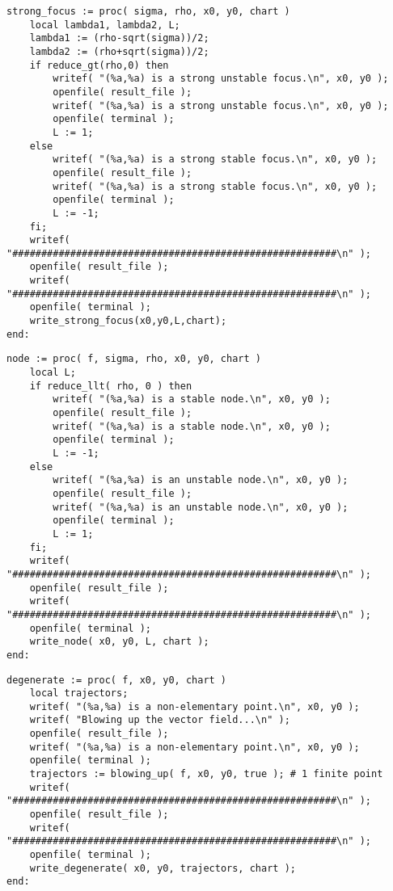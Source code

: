 \documentclass[a4paper,10pt]{article}
\begin{document}
\begin{lstlisting}[name=type]
strong_focus := proc( sigma, rho, x0, y0, chart )
    local lambda1, lambda2, L;
    lambda1 := (rho-sqrt(sigma))/2;
    lambda2 := (rho+sqrt(sigma))/2;
    if reduce_gt(rho,0) then
        writef( "(%a,%a) is a strong unstable focus.\n", x0, y0 );
        openfile( result_file );
        writef( "(%a,%a) is a strong unstable focus.\n", x0, y0 );
        openfile( terminal );
        L := 1;
    else
        writef( "(%a,%a) is a strong stable focus.\n", x0, y0 );
        openfile( result_file );
        writef( "(%a,%a) is a strong stable focus.\n", x0, y0 );
        openfile( terminal );
        L := -1;
    fi;
    writef( "########################################################\n" );
    openfile( result_file );
    writef( "########################################################\n" );
    openfile( terminal );
    write_strong_focus(x0,y0,L,chart);
end:
\end{lstlisting}

\begin{lstlisting}[name=type]
node := proc( f, sigma, rho, x0, y0, chart )
    local L;
    if reduce_llt( rho, 0 ) then
        writef( "(%a,%a) is a stable node.\n", x0, y0 );
        openfile( result_file );
        writef( "(%a,%a) is a stable node.\n", x0, y0 );
        openfile( terminal );
        L := -1;
    else
        writef( "(%a,%a) is an unstable node.\n", x0, y0 );
        openfile( result_file );
        writef( "(%a,%a) is an unstable node.\n", x0, y0 );
        openfile( terminal );
        L := 1;
    fi;
    writef( "########################################################\n" );
    openfile( result_file );
    writef( "########################################################\n" );
    openfile( terminal );
    write_node( x0, y0, L, chart );
end:
\end{lstlisting}

\begin{lstlisting}[name=type]
degenerate := proc( f, x0, y0, chart )
    local trajectors;
    writef( "(%a,%a) is a non-elementary point.\n", x0, y0 );
    writef( "Blowing up the vector field...\n" );
    openfile( result_file );
    writef( "(%a,%a) is a non-elementary point.\n", x0, y0 );
    openfile( terminal );
    trajectors := blowing_up( f, x0, y0, true ); # 1 finite point
    writef( "########################################################\n" );
    openfile( result_file );
    writef( "########################################################\n" );
    openfile( terminal );
    write_degenerate( x0, y0, trajectors, chart );
end:
\end{lstlisting}
\end{document}
